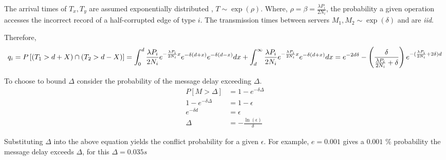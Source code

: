 \documentclass[sigplan,10pt]{acmart}
\begin{document}
The arrival times of $T_x,T_y$ are assumed exponentially distributed , $T \sim \exp (\rho)$. Where, $ \rho = \beta = \frac{\lambda P_i}{2N_i}$, the probability a given operation accesses the incorrect record of a half-corrupted edge of type $i$. The transmission times between servers $M_1, M_2 \sim \exp (\delta)$ and are \emph{iid}.


Therefore,
\begin{dmath*}
  q_{i} =  {P \left[ ( T_1 >  d + X) \cap (T_2 > d-X)  \right]} \\
  =  \int_{0}^{d}  \frac{\lambda P_i}{2 N_i} e^{-\frac{\lambda P_i}{2 N_i} x} e^{-\delta (d+x)} e^{-\delta (d-x)} dx + \int_{d}^{\infty} \frac{\lambda P_i}{2 N_i} e^{-\frac{\lambda P_i}{2 N_i} x} e^{-\delta (d+x)} dx  \\
  =  e^{-2 d \delta} - \left( \frac{\delta}{\frac{\lambda P_i}{2 N_i} + \delta} \right) e^{-(\frac{\lambda P_i}{2 N_i}+ 2\delta)d} \\
\end{dmath*}

To choose to bound $\Delta$ consider the probability of the message delay exceeding  $\Delta$.
\begin{align*}
  P \left[ M > \Delta \right] & = 1 - e^{- \delta \Delta} \\
  1 - e^{- \delta \Delta} & = 1 - \epsilon \\
  e^{- \delta d} & = \epsilon  \\
  \Delta & = - \frac{\ln(\epsilon)}{\delta}
\end{align*}

Substituting $\Delta$ into the above equation yields the conflict probability for a given $\epsilon$. For example, $ e = 0.001$ gives a $0.001$ \% probability the message delay exceeds $\Delta$, for this  $\Delta = 0.035s$
\end{document}
